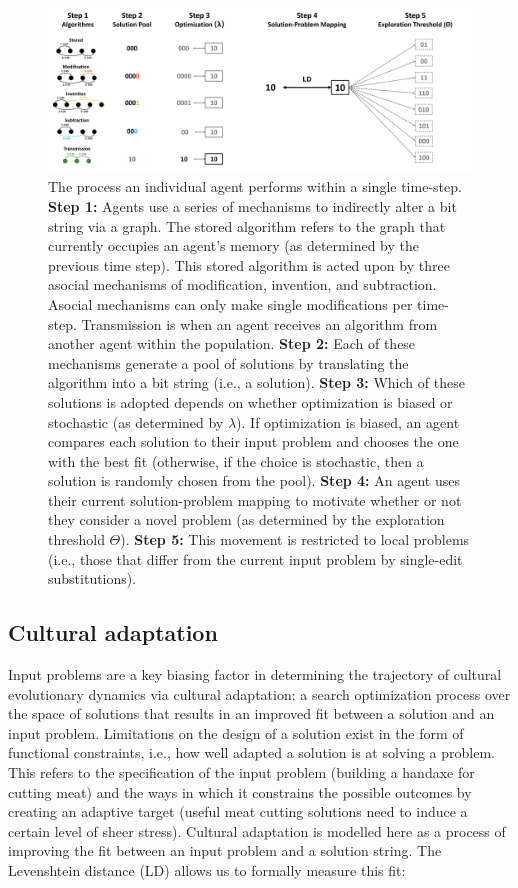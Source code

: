 \documentclass{article}
\begin{document}
\begin{figure}[H]
\begin{center}
    \includegraphics[width=\linewidth]{mechanisms.png}
\end{center}
    \caption{The process an individual agent performs within a single time-step. \textbf{Step 1:} Agents use a series of mechanisms to indirectly alter a bit string via a graph. The stored algorithm refers to the graph that currently occupies an agent's memory (as determined by the previous time step). This stored algorithm is acted upon by three asocial mechanisms of modification, invention, and subtraction. Asocial mechanisms can only make single modifications per time-step. Transmission is when an agent receives an algorithm from another agent within the population. \textbf{Step 2:} Each of these mechanisms generate a pool of solutions by translating the algorithm into a bit string (i.e., a solution). \textbf{Step 3:} Which of these solutions is adopted depends on whether optimization is biased or stochastic (as determined by $\lambda$). If optimization is biased, an agent compares each solution to their input problem and chooses the one with the best fit (otherwise, if the choice is stochastic, then a solution is randomly chosen from the pool). \textbf{Step 4:} An agent uses their current solution-problem mapping to motivate whether or not they consider a novel problem (as determined by the exploration threshold $\Theta$). \textbf{Step 5:} This movement is restricted to local problems (i.e., those that differ from the current input problem by single-edit substitutions).}
    \label{fig:mechanisms}
\end{figure}

\subsection{Cultural adaptation}
Input problems are a key biasing factor in determining the trajectory of cultural evolutionary dynamics via cultural adaptation: a search optimization process over the space of solutions that results in an improved fit between a solution and an input problem. Limitations on the design of a solution exist in the form of functional constraints, i.e., how well adapted a solution is at solving a problem. This refers to the specification of the input problem (building a handaxe for cutting meat) and the ways in which it constrains the possible outcomes by creating an adaptive target (useful meat cutting solutions need to induce a certain level of sheer stress). Cultural adaptation is modelled here as a process of improving the fit between an input problem and a solution string. The Levenshtein distance (LD) allows us to formally measure this fit:
\end{document}

